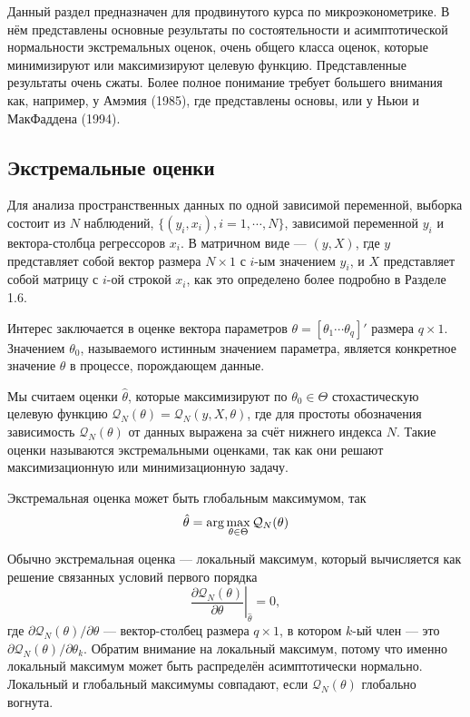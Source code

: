 Данный раздел предназначен для продвинутого курса по микроэконометрике. В нём представлены основные результаты по состоятельности и асимптотической нормальности экстремальных оценок, очень общего класса оценок, которые минимизируют или максимизируют целевую функцию. Представленные результаты очень сжаты. Более полное понимание требует большего внимания как, например, у Амэмия (1985), где представлены основы, или у Ньюи и МакФаддена (1994).

\subsection{Экстремальные оценки}

Для анализа пространственных данных по одной зависимой переменной, выборка состоит из $N$ наблюдений, 
$\{(y_i,x_i),i=1,\cdots,N\}$, зависимой переменной $y_i$ и вектора-столбца регрессоров $x_i$. 
В матричном виде --- $(y,X)$, где $y$ представляет собой вектор размера $N \times 1$ с $i$-ым значением $y_i$, и $X$ представляет собой матрицу с $i$-ой строкой $x_i$, как это определено более подробно в Разделе 1.6.

Интерес заключается в оценке вектора параметров $\theta=[\theta_1 \cdots \theta_q]'$ размера $q \times 1$. Значением $\theta_0$, называемого истинным значением параметра, является конкретное значение $\theta$ в процессе, порождающем данные.

Мы считаем оценки $\hat{\theta}$, которые максимизируют по $\theta_0 \in \Theta$ стохастическую целевую функцию $\mathcal{Q}_N(\theta)=\mathcal{Q}_N(y,X,\theta)$, где для простоты обозначения зависимость $\mathcal{Q}_N(\theta)$ от данных выражена за счёт нижнего индекса $N$. Такие оценки называются экстремальными оценками, так как они решают максимизационную или минимизационную задачу.

Экстремальная оценка может быть глобальным максимумом, так
\begin{equation}
\hat{\theta}= \arg\max _{\theta \in \Theta} \mathcal{Q}_N(\theta)
\end{equation}

Обычно  экстремальная оценка --- локальный максимум, который вычисляется как решение связанных условий первого порядка
\begin{equation}
\left. \frac{\partial \mathcal{Q}_N(\theta)}{\partial \theta} \right|_{\hat{\theta}}=0,
\end{equation}
где $\partial \mathcal{Q}_N(\theta)/ \partial \theta$ --- вектор-столбец размера $q \times 1$, в котором $k$-ый член --- это $\partial \mathcal{Q}_N(\theta)/ \partial \theta_k$. Обратим внимание на локальный максимум, потому что именно локальный максимум может быть распределён асимптотически нормально. Локальный и глобальный максимумы совпадают, если $\mathcal{Q}_N(\theta)$ глобально вогнута.

